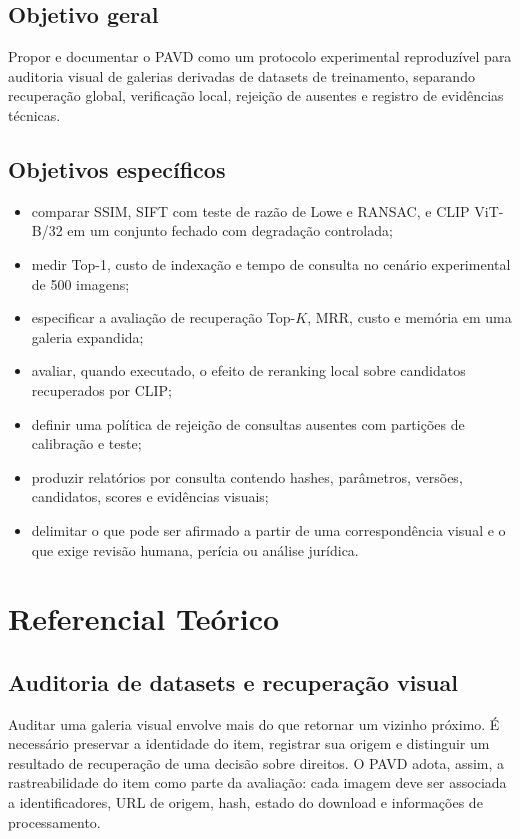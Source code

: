 \documentclass[12pt]{article}
\newcommand{\pavd}{PAVD}
\newcommand{\clip}{CLIP}
\newcommand{\sift}{SIFT}
\newcommand{\ssim}{SSIM}
\begin{document}
\subsection{Objetivo geral}

Propor e documentar o \pavd{} como um protocolo experimental reproduzível para
auditoria visual de galerias derivadas de datasets de treinamento, separando
recuperação global, verificação local, rejeição de ausentes e registro de
evidências técnicas.

\subsection{Objetivos específicos}

\begin{itemize}[leftmargin=*]
  \item comparar \ssim{}, \sift{} com teste de razão de Lowe e RANSAC, e
  \clip{} ViT-B/32 em um conjunto fechado com degradação controlada;
  \item medir Top-1, custo de indexação e tempo de consulta no cenário
  experimental de 500 imagens;
  \item especificar a avaliação de recuperação Top-$K$, MRR, custo e memória
  em uma galeria expandida;
  \item avaliar, quando executado, o efeito de reranking local sobre
  candidatos recuperados por \clip{};
  \item definir uma política de rejeição de consultas ausentes com partições
  de calibração e teste;
  \item produzir relatórios por consulta contendo hashes, parâmetros,
  versões, candidatos, scores e evidências visuais;
  \item delimitar o que pode ser afirmado a partir de uma correspondência
  visual e o que exige revisão humana, perícia ou análise jurídica.
\end{itemize}

\section{Referencial Teórico}

\subsection{Auditoria de datasets e recuperação visual}

Auditar uma galeria visual envolve mais do que retornar um vizinho próximo.
É necessário preservar a identidade do item, registrar sua origem e distinguir
um resultado de recuperação de uma decisão sobre direitos. O \pavd{} adota,
assim, a rastreabilidade do item como parte da avaliação: cada imagem deve ser
associada a identificadores, URL de origem, hash, estado do download e
informações de processamento.
\end{document}
